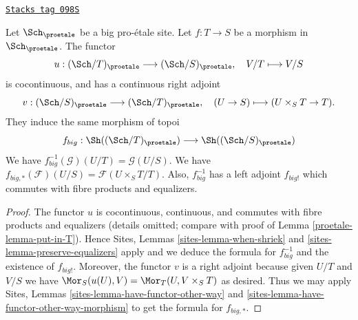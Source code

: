 \begin{lemma}
\label{proetale-lemma-morphism-big}
\href{https://stacks.math.columbia.edu/tag/098S}{\texttt{Stacks tag 098S}}

Let $\Sch_\proetale$ be a big pro-\'etale site.
Let $f : T \to S$ be a morphism in $\Sch_\proetale$.
The functor
$$
u : (\Sch/T)_\proetale \longrightarrow (\Sch/S)_\proetale, \quad
V/T \longmapsto V/S
$$
is cocontinuous, and has a continuous right adjoint
$$
v : (\Sch/S)_\proetale \longrightarrow (\Sch/T)_\proetale, \quad
(U \to S) \longmapsto (U \times_S T \to T).
$$
They induce the same morphism of topoi
$$
f_{big} :
\Sh((\Sch/T)_\proetale)
\longrightarrow
\Sh((\Sch/S)_\proetale)
$$
We have $f_{big}^{-1}(\mathcal{G})(U/T) = \mathcal{G}(U/S)$.
We have $f_{big, *}(\mathcal{F})(U/S) = \mathcal{F}(U \times_S T/T)$.
Also, $f_{big}^{-1}$ has a left adjoint $f_{big!}$ which commutes with
fibre products and equalizers.
\end{lemma}

\begin{proof}

The functor $u$ is cocontinuous, continuous, and commutes with fibre products
and equalizers (details omitted; compare with proof of
Lemma \ref{proetale-lemma-put-in-T}). Hence
Sites, Lemmas \ref{sites-lemma-when-shriek} and
\ref{sites-lemma-preserve-equalizers}
apply and we deduce the formula
for $f_{big}^{-1}$ and the existence of $f_{big!}$. Moreover,
the functor $v$ is a right adjoint because given $U/T$ and $V/S$
we have $\Mor_S(u(U), V) = \Mor_T(U, V \times_S T)$
as desired. Thus we may apply
Sites, Lemmas \ref{sites-lemma-have-functor-other-way} and
\ref{sites-lemma-have-functor-other-way-morphism}
to get the formula for $f_{big, *}$.
\end{proof}

